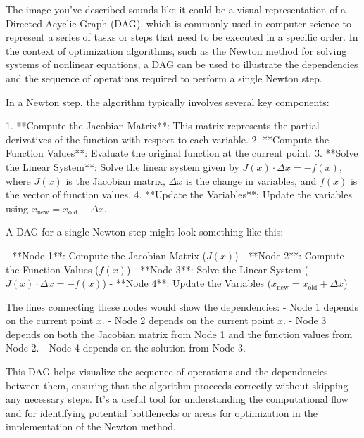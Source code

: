 The image you've described sounds like it could be a visual representation of a Directed Acyclic Graph (DAG), which is commonly used in computer science to represent a series of tasks or steps that need to be executed in a specific order. In the context of optimization algorithms, such as the Newton method for solving systems of nonlinear equations, a DAG can be used to illustrate the dependencies and the sequence of operations required to perform a single Newton step.

In a Newton step, the algorithm typically involves several key components:

1. **Compute the Jacobian Matrix**: This matrix represents the partial derivatives of the function with respect to each variable.
2. **Compute the Function Values**: Evaluate the original function at the current point.
3. **Solve the Linear System**: Solve the linear system given by \( J(x) \cdot \Delta x = -f(x) \), where \( J(x) \) is the Jacobian matrix, \( \Delta x \) is the change in variables, and \( f(x) \) is the vector of function values.
4. **Update the Variables**: Update the variables using \( x_{\text{new}} = x_{\text{old}} + \Delta x \).

A DAG for a single Newton step might look something like this:

- **Node 1**: Compute the Jacobian Matrix (\( J(x) \))
- **Node 2**: Compute the Function Values (\( f(x) \))
- **Node 3**: Solve the Linear System (\( J(x) \cdot \Delta x = -f(x) \))
- **Node 4**: Update the Variables (\( x_{\text{new}} = x_{\text{old}} + \Delta x \))

The lines connecting these nodes would show the dependencies:
- Node 1 depends on the current point \( x \).
- Node 2 depends on the current point \( x \).
- Node 3 depends on both the Jacobian matrix from Node 1 and the function values from Node 2.
- Node 4 depends on the solution from Node 3.

This DAG helps visualize the sequence of operations and the dependencies between them, ensuring that the algorithm proceeds correctly without skipping any necessary steps. It's a useful tool for understanding the computational flow and for identifying potential bottlenecks or areas for optimization in the implementation of the Newton method.